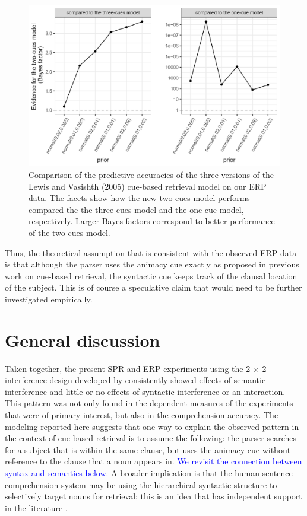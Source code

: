 \documentclass[review,preprint,12pt,authoryear,floatsintext]{elsarticle}
\begin{document}
{{\begin{figure}[ht]
    \centering
    \caption{Comparison of the predictive accuracies of the three versions of the Lewis and Vasishth (2005) cue-based retrieval model on our ERP data. The facets show how the new two-cues model performs compared the the three-cues model and the one-cue model, respectively. Larger Bayes factors correspond to better performance of the two-cues model.}
    \label{fig:BF_compmods}
    \includegraphics[width=\linewidth]{BF_plot_compmodels.png}
\end{figure}

Thus, the theoretical assumption that is consistent with the observed ERP data is that although the parser uses the animacy cue exactly as proposed in previous work on cue-based retrieval, the syntactic cue keeps track of the clausal location of the subject. This is of course a speculative claim that would need to be further investigated empirically. 

}%

\section*{General discussion}

{Taken together, the present SPR and ERP experiments using the 2 $\times$ 2 interference design developed by \cite{vandyke07} consistently showed effects of semantic interference and little or no effects of syntactic interference or an interaction.}\label{only_this_design} This pattern was not only found in the dependent measures of the experiments that were of primary interest, but also in the comprehension accuracy. 
The modeling reported here suggests that one way to explain the observed pattern in the context of cue-based retrieval is to assume the following: the parser searches for a subject that is within the same clause, but uses the animacy cue without reference to the clause that a noun appears in. \textcolor{blue}{We revisit the connection between syntax and semantics below.} A broader implication is that the human sentence comprehension system may be using the hierarchical syntactic structure to selectively target nouns for retrieval; this is an idea that has independent support in the literature \citep[e.g.,][]{Sturt2003,dillon2013,yadav2021individual}.

}
\end{document}
